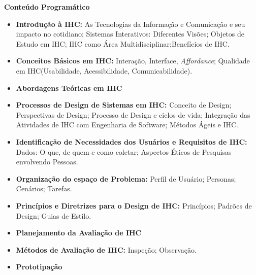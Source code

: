
\begin{snugshade}\begin{center}\textbf{
    Conteúdo Programático
}\end{center}\end{snugshade}

\begin{itemize}

 \item \textbf{Introdução à IHC:} As Tecnologias da Informação e Comunicação e seu impacto no cotidiano; Sistemas Interativos: Diferentes Visões; Objetos de Estudo em IHC; IHC como Área Multidisciplinar;Benefícios de IHC.

 \item \textbf{Conceitos Básicos em IHC: }Interação, Interface, \textit{Affordance}; Qualidade em IHC(Usabilidade, Acessibilidade, Comunicabilidade).

 \item \textbf{Abordagens Teóricas em IHC}

 \item \textbf{Processos de Design de Sistemas em IHC:} Conceito de Design; Perspectivas de Design; Processo de Design e ciclos de vida; Integração das Atividades de IHC com Engenharia de Software; Métodos Ágeis e IHC.

 \item \textbf{Identificação de Necessidades dos Usuários e Requisitos de IHC:} Dados: O que, de quem e como coletar; Aspectos Éticos de Pesquisas envolvendo Pessoas.

 \item \textbf{Organização do espaço de Problema:} Perfil de Usuário; Personas; Cenários; Tarefas.

 \item \textbf{Princípios e Diretrizes para o Design de IHC:} Princípios; Padrões de Design; Guias de Estilo.

 \item \textbf{Planejamento da Avaliação de IHC} 

 \item \textbf{Métodos de Avaliação de IHC:} Inspe\c{c}\~ao; Observa\c{c}\~ao.

 \item \textbf{Prototipa\c{c}\~ao}

\end{itemize}


